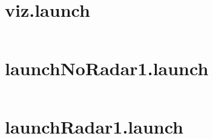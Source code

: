 \section{viz.launch}
\label{Appdix:viz.launch}
\inputminted{xml}{ros_system/launch/src/sublaunch/viz.launch}

\section{launchNoRadar1.launch}
\label{Appdix:launchNoRadar1.launch}
\inputminted{xml}{ros_system/launch/launchNoRadar1.launch}

\section{launchRadar1.launch}
\label{Appdix:launchRadar1.launch}
\inputminted{xml}{ros_system/launch/launchRadar1.launch}